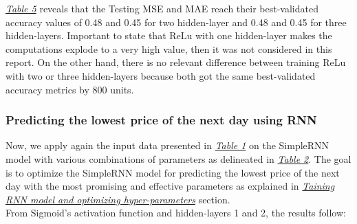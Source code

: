 \hyperref[table:Results for RNN, ReLu, High]{\textit{Table 5}} reveals that the Testing MSE and MAE reach their best-validated accuracy values of 0.48 and 0.45 for two hidden-layer and 0.48 and 0.45 for three hidden-layers. Important to state that ReLu with one hidden-layer makes the computations explode to a very high value, then it was not considered in this report. On the other hand, there is no relevant difference between training ReLu with two or three hidden-layers because both got the same best-validated accuracy metrics by 800 units.\\

\subsubsection{Predicting the lowest price of the next day using RNN}
\label{chap:Predicting the lowest price of the next day using RNN}

\quad Now, we apply again the input data presented in \hyperref[table:TrainingFeatures]{\textit{Table 1}} on the SimpleRNN model with various combinations of parameters as delineated in \hyperref[table:Hyper-parameters for SimpleRNN]{\textit{Table 2}}. The goal is to optimize the SimpleRNN model for predicting the lowest price of the next day with the most promising and effective parameters as explained in \hyperref[chap:Training RNN model and optimizing hyper-parameters]{\textit{Taining RNN model and optimizing hyper-parameters}} section.\\

From Sigmoid's activation function and hidden-layers 1 and 2, the results follow:


